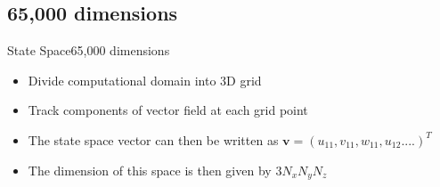 \documentclass[10pt]{beamer}
\newcommand{\Vector}[1]{\mathbf{#1}}
\begin{document}
\subsection{65,000 dimensions}
\begin{frame}{State Space}{65,000 dimensions}
\begin{itemize}
\item<1-> Divide computational domain into 3D grid
\item<2-> Track components of vector field at each grid point
\item<3-> The state space vector can then be written as $\Vector{v} = (u_{11},v_{11},w_{11},u_{12}....)^T$
\item<4-> The dimension of this space is then given by $3N_xN_yN_z$
\end{itemize}
\end{frame}
\end{document}
